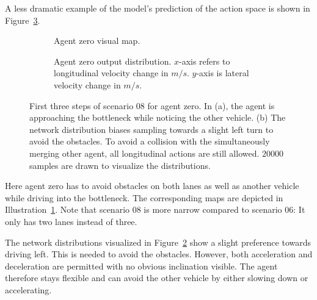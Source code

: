 A less dramatic example of the model's prediction of the action space is shown in Figure~\ref{fig:sample_space_pruning_example_10}.
\begin{figure}
\begin{subfigure}{\textwidth}
  \centering
  \scalebox{0.7}{
  
  }
  \caption{Agent zero visual map.}
  \label{fig:sc10_example_maps}
\end{subfigure}

\begin{subfigure}{\textwidth}
  \centering
  \scalebox{0.7}{
  
  }
  \caption{Agent zero output distribution. $x$-axis refers to longitudinal velocity change in $m/s$. $y$-axis is lateral velocity change in $m/s$.}
  \label{fig:sc10_example_dists}
\end{subfigure}
\caption[Action space pruning for scenario 08]{First three steps of scenario 08 for agent zero. In (a), the agent is approaching the bottleneck while noticing the other vehicle. (b) The network distribution biases sampling towards a slight left turn to avoid the obstacles. To avoid a collision with the simultaneously merging other agent, all longitudinal actions are still allowed. $20000$ samples are drawn to visualize the distributions.}
\label{fig:sample_space_pruning_example_10}
\end{figure}
Here agent zero has to avoid obstacles on both lanes as well as another vehicle while driving into the bottleneck. The corresponding maps are depicted in Illustration~\ref{fig:sc10_example_maps}. Note that scenario 08 is more narrow compared to scenario 06: It only has two lanes instead of three.

The network distributions visualized in Figure~\ref{fig:sc10_example_dists} show a slight preference towards driving left. This is needed to avoid the obstacles. However, both acceleration and deceleration are permitted with no obvious inclination visible. The agent therefore stays flexible and can avoid the other vehicle by either slowing down or accelerating.

